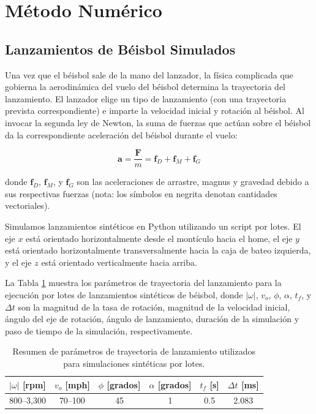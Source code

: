 \documentclass[12pt,a4paper]{article}
\begin{document}
\section{Método Numérico}

\subsection{Lanzamientos de Béisbol Simulados}

Una vez que el béisbol sale de la mano del lanzador, la física complicada que gobierna la aerodinámica del vuelo del béisbol determina la trayectoria del lanzamiento. El lanzador elige un tipo de lanzamiento (con una trayectoria prevista correspondiente) e imparte la velocidad inicial y rotación al béisbol. Al invocar la segunda ley de Newton, la suma de fuerzas que actúan sobre el béisbol da la correspondiente aceleración del béisbol durante el vuelo:

\begin{equation}
\mathbf{a} = \frac{\mathbf{F}}{m} = \mathbf{f}_D + \mathbf{f}_M + \mathbf{f}_G
\end{equation}

donde $\mathbf{f}_D$, $\mathbf{f}_M$, y $\mathbf{f}_G$ son las aceleraciones de arrastre, magnus y gravedad debido a sus respectivas fuerzas (nota: los símbolos en negrita denotan cantidades vectoriales).

Simulamos lanzamientos sintéticos en Python utilizando un script por lotes. El eje $x$ está orientado horizontalmente desde el montículo hacia el home, el eje $y$ está orientado horizontalmente transversalmente hacia la caja de bateo izquierda, y el eje $z$ está orientado verticalmente hacia arriba.

La Tabla \ref{tab:parametros} muestra los parámetros de trayectoria del lanzamiento para la ejecución por lotes de lanzamientos sintéticos de béisbol, donde $|\omega|$, $v_o$, $\phi$, $\alpha$, $t_f$, y $\Delta t$ son la magnitud de la tasa de rotación, magnitud de la velocidad inicial, ángulo del eje de rotación, ángulo de lanzamiento, duración de la simulación y paso de tiempo de la simulación, respectivamente.

\begin{table}[H]
\centering
\caption{Resumen de parámetros de trayectoria de lanzamiento utilizados para simulaciones sintéticas por lotes.}
\label{tab:parametros}
\begin{tabular}{@{}cccccc@{}}
\toprule
$|\omega|$ [rpm] & $v_o$ [mph] & $\phi$ [grados] & $\alpha$ [grados] & $t_f$ [s] & $\Delta t$ [ms] \\
\midrule
800--3,300 & 70--100 & 45 & 1 & 0.5 & 2.083 \\
\bottomrule
\end{tabular}
\end{table}
\end{document}
